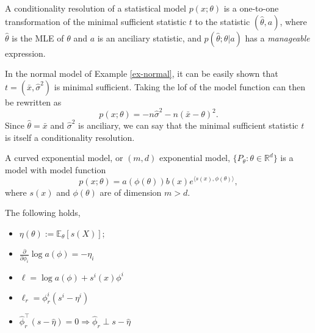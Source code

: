 \begin{definition}
    A conditionality resolution of a statistical model $p(x; \theta)$ is a one-to-one transformation of the minimal sufficient statistic $t$ to the statistic $(\hat\theta, a)$, where $\hat\theta$ is the MLE of $\theta$ and $a$ is an anciliary statistic, and $p(\hat\theta; \theta | a)$ has a \textit{manageable} expression.
\end{definition}

\begin{example}
    In the normal model of Example \ref{ex-normal}, it can be easily shown that $t = (\bar x, \hat\sigma^2)$ is minimal sufficient. Taking the lof of the model function can then be rewritten as
    \begin{equation*}
        p(x; \theta) = - n\hat\sigma^2 - n(\bar x - \theta)^2.
    \end{equation*}
    Since $\hat\theta = \bar x$ and $\hat\sigma^2$ is anciliary, we can say that the minimal sufficient statistic $t$ is itself a conditionality resolution.
\end{example}

\begin{definition}
    A curved exponential model, or $(m, d)$ exponential model, $\{ P_\theta : \theta \in \mathbb{R}^d \}$ is a model with model function
    \begin{equation*}
        p(x; \theta) = a(\phi(\theta))b(x)e^{\langle s(x), \phi(\theta)\rangle},
    \end{equation*}
    where $s(x)$ and $\phi(\theta)$ are of dimension $m > d$.
\end{definition}

\begin{remark}
    The following holds,
    \begin{itemize}
        \item $\eta(\theta) := \mathbb{E}_\theta[s(X)]$;
        \item $\frac{\partial}{\partial \phi_i} \log a(\phi) = -\eta_i$
        \item $\ell = \log a(\phi) + s^i(x)\phi^i$
        \item $\ell_r = \phi^i_r(s^i - \eta^i)$
        \item $\hat\phi^\top_r(s - \hat\eta) = 0 \Rightarrow \hat\phi_r \perp s - \hat\eta$
    \end{itemize}
\end{remark}





